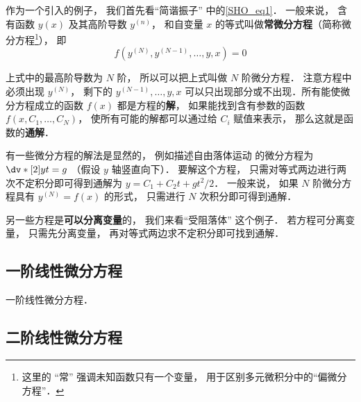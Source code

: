 
\begin{issues}
\issueDraft
\end{issues}


作为一个引入的例子， 我们首先看“简谐振子” 中的\autoref{SHO_eq1}． 一般来说， 含有函数 $y(x)$ 及其高阶导数 $y^{(n)}$， 和自变量 $x$ 的等式叫做\textbf{常微分方程}（简称微分方程\footnote{这里的 “常” 强调未知函数只有一个变量， 用于区别多元微积分中的“偏微分方程”．}）， 即
\begin{equation}
f(y^{(N)}, y^{(N-1)}, \dots, y, x) = 0
\end{equation}

上式中的最高阶导数为 $N$ 阶， 所以可以把上式叫做 $N$ 阶微分方程． 注意方程中必须出现 $y^{(N)}$， 剩下的 $y^{(N-1)}, \dots, y, x$ 可以只出现部分或不出现．所有能使微分方程成立的函数 $f(x)$ 都是方程的\textbf{解}， 如果能找到含有参数的函数 $f(x,C_1, \dots , C_N)$， 使所有可能的解都可以通过给 $C_i$ 赋值来表示， 那么这就是函数的\textbf{通解}．

有一些微分方程的解法是显然的， 例如描述自由落体运动 的微分方程为 $\dv*[2]{y}{t} = g$ （假设 $y$ 轴竖直向下）． 要解这个方程， 只需对等式两边进行两次不定积分即可得到通解为 $y = C_1 + C_2 t + gt^2/2$． 一般来说， 如果 $N$ 阶微分方程具有 $y^{(N)} = f(x)$ 的形式， 只需进行 $N$ 次积分即可得到通解．

另一些方程是\textbf{可以分离变量}的， 我们来看“受阻落体” 这个例子． 若方程可分离变量， 只需先分离变量， 再对等式两边求不定积分即可找到通解．



\subsection{一阶线性微分方程}
一阶线性微分方程．

\subsection{二阶线性微分方程}

